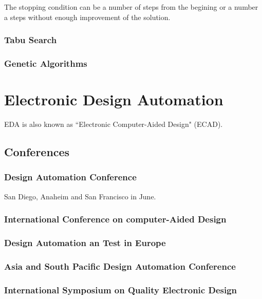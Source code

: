 \documentclass[12pt,a4paper]{article}
\begin{document}
The stopping condition can be a number of steps from the begining or a number a steps without enough improvement of the solution.

\subsubsection{Tabu Search}

\subsubsection{Genetic Algorithms}



\section{Electronic Design Automation}
EDA is also known as ``Electronic Computer-Aided Design" (ECAD).

\subsection{Conferences}
\subsubsection{Design Automation Conference}
San Diego, Anaheim and San Francisco in June.
\subsubsection{International Conference on computer-Aided Design}
\subsubsection{Design Automation an Test in Europe}
\subsubsection{Asia and South Pacific Design Automation Conference}
\subsubsection{International Symposium on Quality Electronic Design}



\newpage

\glsaddall
\printglossaries

\newpage
% 


\end{document}
